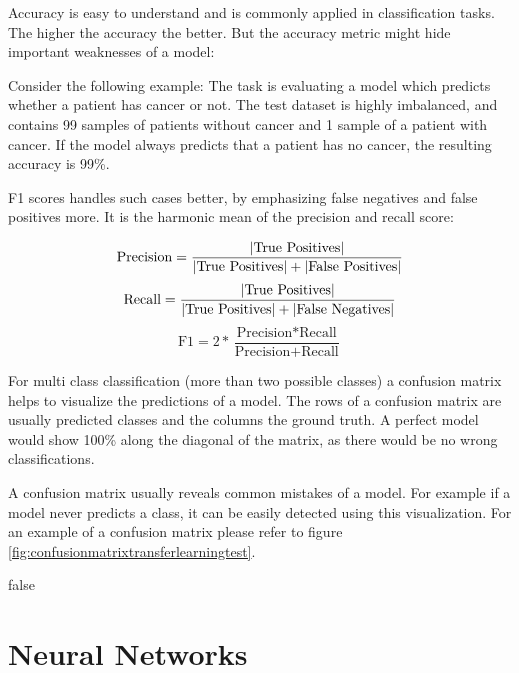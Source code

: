 \documentclass[draft,final,oneside]{vutinfth} %
\begin{document}
Accuracy is easy to understand and is commonly applied in classification tasks. The higher the accuracy the better. But the accuracy metric might hide important weaknesses of a model:

Consider the following example: The task is evaluating a model which predicts whether a patient has cancer or not. The test dataset is highly imbalanced, and contains 99 samples of patients without cancer and 1 sample of a patient with cancer. If the model always predicts that a patient has no cancer, the resulting accuracy is 99\%. 

F1 scores handles such cases better, by emphasizing false negatives and false positives more. It is the harmonic mean of the precision and recall score:

\begin{equation}
\text{Precision}=\frac{|\text{True Positives}|} {|\text{True Positives}| + |\text{False Positives}|}\\
\end{equation}
\begin{equation}
\text{Recall}=\frac{|\text{True Positives}|} {|\text{True Positives}| + |\text{False Negatives}|}\\
\end{equation}
\begin{equation}
\text{F1} = 2 * \frac{\text{Precision} * \text{Recall}}{\text{Precision} + \text{Recall}}
\end{equation}

For multi class classification (more than two possible classes) a confusion matrix helps to visualize the predictions of a model. The rows of a confusion matrix are usually predicted classes and the columns the ground truth. A perfect model would show 100\% along the diagonal of the matrix, as there would be no wrong classifications.

A confusion matrix usually reveals common mistakes of a model. For example if a model never predicts a class, it can be easily detected using this visualization. For an example of a confusion matrix please refer to figure \ref{fig:confusionmatrixtransferlearningtest}.

\if false




\fi

\section{Neural Networks}
\end{document}
